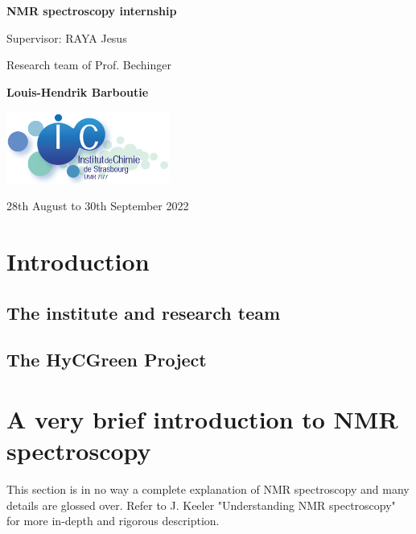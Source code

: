 \documentclass[12pt]{article}
\begin{document}
\begin{titlepage}
    \begin{center}
        \vspace*{1cm}
        \Huge
        \textbf{NMR spectroscopy internship}
        
        \vspace{0.5cm}
        \LARGE
        Supervisor: RAYA Jesus
        
        Research team of Prof. Bechinger
        
        \vspace{1.5cm}
        \textbf{Louis-Hendrik Barboutie}
        
        \vfill
        

        \includegraphics[width=0.4\textwidth]{logo_institut.png}
        
        \Large
        28th August to 30th September 2022
    \end{center}
\end{titlepage}

\tableofcontents
\newpage
\listoffigures
\listoftables
\newpage

\section{Introduction}

\subsection{The institute and research team}

\subsection{The HyCGreen Project}

\section{A very brief introduction to NMR spectroscopy}

This section is in no way a complete explanation of NMR spectroscopy and many details are glossed over. Refer to J. Keeler "Understanding NMR spectroscopy" for more in-depth and rigorous description.
\end{document}
